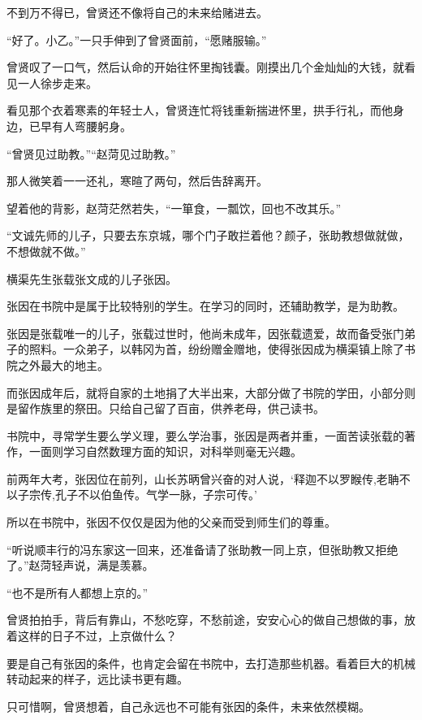 不到万不得已，曾贤还不像将自己的未来给赌进去。

“好了。小乙。”一只手伸到了曾贤面前，“愿赌服输。”

曾贤叹了一口气，然后认命的开始往怀里掏钱囊。刚摸出几个金灿灿的大钱，就看见一人徐步走来。

看见那个衣着寒素的年轻士人，曾贤连忙将钱重新揣进怀里，拱手行礼，而他身边，已早有人弯腰躬身。

“曾贤见过助教。”“赵菏见过助教。”

那人微笑着一一还礼，寒暄了两句，然后告辞离开。

望着他的背影，赵菏茫然若失，“一箪食，一瓢饮，回也不改其乐。”

“文诚先师的儿子，只要去东京城，哪个门子敢拦着他？颜子，张助教想做就做，不想做就不做。”

横渠先生张载张文成的儿子张因。

张因在书院中是属于比较特别的学生。在学习的同时，还辅助教学，是为助教。

张因是张载唯一的儿子，张载过世时，他尚未成年，因张载遗爱，故而备受张门弟子的照料。一众弟子，以韩冈为首，纷纷赠金赠地，使得张因成为横渠镇上除了书院之外最大的地主。

而张因成年后，就将自家的土地捐了大半出来，大部分做了书院的学田，小部分则是留作族里的祭田。只给自己留了百亩，供养老母，供己读书。

书院中，寻常学生要么学义理，要么学治事，张因是两者并重，一面苦读张载的著作，一面则学习自然数理方面的知识，对科举则毫无兴趣。

前两年大考，张因位在前列，山长苏昞曾兴奋的对人说，‘释迦不以罗睺传,老聃不以子宗传,孔子不以伯鱼传。气学一脉，子宗可传。’

所以在书院中，张因不仅仅是因为他的父亲而受到师生们的尊重。

“听说顺丰行的冯东家这一回来，还准备请了张助教一同上京，但张助教又拒绝了。”赵菏轻声说，满是羡慕。

“也不是所有人都想上京的。”

曾贤拍拍手，背后有靠山，不愁吃穿，不愁前途，安安心心的做自己想做的事，放着这样的日子不过，上京做什么？

要是自己有张因的条件，也肯定会留在书院中，去打造那些机器。看着巨大的机械转动起来的样子，远比读书更有趣。

只可惜啊，曾贤想着，自己永远也不可能有张因的条件，未来依然模糊。

